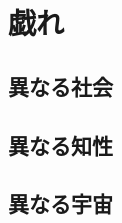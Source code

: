 
\newpage


\newpage

\part{戯れ}

\chapter{異なる社会}

\chapter{異なる知性}

\chapter{異なる宇宙}

\backmatter

\printbibliography


